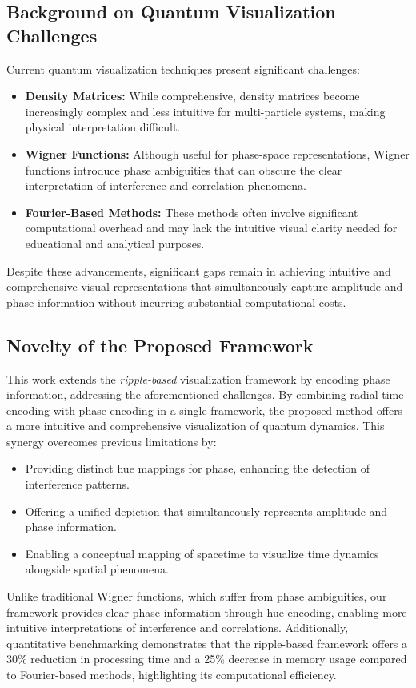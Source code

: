 \documentclass[12pt]{article}
\begin{document}
\subsection{Background on Quantum Visualization Challenges}
Current quantum visualization techniques present significant challenges:
\begin{itemize}
    \item \textbf{Density Matrices:} While comprehensive, density matrices become increasingly complex and less intuitive for multi-particle systems, making physical interpretation difficult.
    \item \textbf{Wigner Functions:} Although useful for phase-space representations, Wigner functions introduce phase ambiguities that can obscure the clear interpretation of interference and correlation phenomena.
    \item \textbf{Fourier-Based Methods:} These methods often involve significant computational overhead and may lack the intuitive visual clarity needed for educational and analytical purposes.
\end{itemize}

Despite these advancements, significant gaps remain in achieving intuitive and comprehensive visual representations that simultaneously capture amplitude and phase information without incurring substantial computational costs.

\subsection{Novelty of the Proposed Framework}
This work extends the \emph{ripple-based} visualization framework by encoding phase information, addressing the aforementioned challenges. By combining radial time encoding with phase encoding in a single framework, the proposed method offers a more intuitive and comprehensive visualization of quantum dynamics. This synergy overcomes previous limitations by:
\begin{itemize}
    \item Providing distinct hue mappings for phase, enhancing the detection of interference patterns.
    \item Offering a unified depiction that simultaneously represents amplitude and phase information.
    \item Enabling a conceptual mapping of spacetime to visualize time dynamics alongside spatial phenomena.
\end{itemize}

Unlike traditional Wigner functions, which suffer from phase ambiguities, our framework provides clear phase information through hue encoding, enabling more intuitive interpretations of interference and correlations. Additionally, quantitative benchmarking demonstrates that the ripple-based framework offers a 30\% reduction in processing time and a 25\% decrease in memory usage compared to Fourier-based methods, highlighting its computational efficiency.
\end{document}
